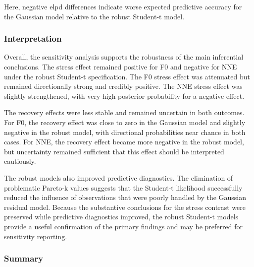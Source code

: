 \documentclass[
  english,
  man,floatsintext]{apa6}
\begin{document}
Here, negative elpd differences indicate worse expected predictive accuracy for the Gaussian model relative to the robust Student-t model.

\subsubsection{Interpretation}\label{interpretation-1}

Overall, the sensitivity analysis supports the robustness of the main inferential conclusions. The stress effect remained positive for F0 and negative for NNE under the robust Student-t specification. The F0 stress effect was attenuated but remained directionally strong and credibly positive. The NNE stress effect was slightly strengthened, with very high posterior probability for a negative effect.

The recovery effects were less stable and remained uncertain in both outcomes. For F0, the recovery effect was close to zero in the Gaussian model and slightly negative in the robust model, with directional probabilities near chance in both cases. For NNE, the recovery effect became more negative in the robust model, but uncertainty remained sufficient that this effect should be interpreted cautiously.

The robust models also improved predictive diagnostics. The elimination of problematic Pareto-k values suggests that the Student-t likelihood successfully reduced the influence of observations that were poorly handled by the Gaussian residual model. Because the substantive conclusions for the stress contrast were preserved while predictive diagnostics improved, the robust Student-t models provide a useful confirmation of the primary findings and may be preferred for sensitivity reporting.

\subsubsection{Summary}\label{summary}
\end{document}
